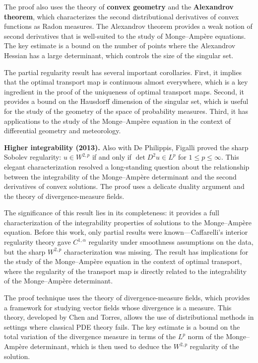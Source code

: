 The proof also uses the theory of \textbf{convex geometry} and the \textbf{Alexandrov theorem}, which characterizes the second distributional derivatives of convex functions as Radon measures. The Alexandrov theorem provides a weak notion of second derivatives that is well-suited to the study of Monge--Amp\`ere equations. The key estimate is a bound on the number of points where the Alexandrov Hessian has a large determinant, which controls the size of the singular set.

The partial regularity result has several important corollaries. First, it implies that the optimal transport map is continuous almost everywhere, which is a key ingredient in the proof of the uniqueness of optimal transport maps. Second, it provides a bound on the Hausdorff dimension of the singular set, which is useful for the study of the geometry of the space of probability measures. Third, it has applications to the study of the Monge--Amp\`ere equation in the context of differential geometry and meteorology.

\textbf{Higher integrability (2013).} Also with De Philippis, Figalli proved the sharp Sobolev regularity: $u \in W^{2,p}$ if and only if $\det D^2 u \in L^p$ for $1 \le p \le \infty$. This elegant characterization resolved a long-standing question about the relationship between the integrability of the Monge--Amp\`ere determinant and the second derivatives of convex solutions. The proof uses a delicate duality argument and the theory of divergence-measure fields.

The significance of this result lies in its completeness: it provides a full characterization of the integrability properties of solutions to the Monge--Amp\`ere equation. Before this work, only partial results were known---Caffarelli's interior regularity theory gave $C^{1,\alpha}$ regularity under smoothness assumptions on the data, but the sharp $W^{2,p}$ characterization was missing. The result has implications for the study of the Monge--Amp\`ere equation in the context of optimal transport, where the regularity of the transport map is directly related to the integrability of the Monge--Amp\`ere determinant.

The proof technique uses the theory of divergence-measure fields, which provides a framework for studying vector fields whose divergence is a measure. This theory, developed by Chen and Torres, allows the use of distributional methods in settings where classical PDE theory fails. The key estimate is a bound on the total variation of the divergence measure in terms of the $L^p$ norm of the Monge--Amp\`ere determinant, which is then used to deduce the $W^{2,p}$ regularity of the solution.

